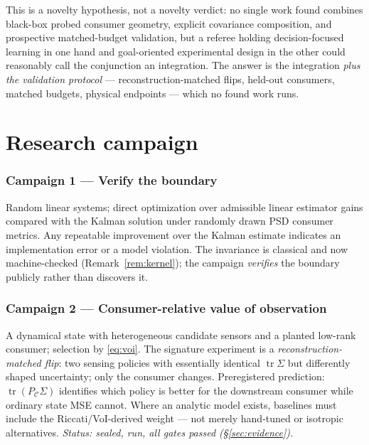 \documentclass{article}
\theoremstyle{definition}
\theoremstyle{remark}
\newcommand{\PC}{P_{\mathcal{C}}}
\newcommand{\tr}{\operatorname{tr}}
\newcommand{\Sig}{\Sigma}
\begin{document}
This is a novelty hypothesis, not a novelty verdict: no single work found
combines black-box probed consumer geometry, explicit covariance
composition, and prospective matched-budget validation, but a referee
holding decision-focused learning in one hand and goal-oriented experimental
design in the other could reasonably call the conjunction an integration.
The answer is the integration \emph{plus the validation protocol} ---
reconstruction-matched flips, held-out consumers, matched budgets, physical
endpoints --- which no found work runs.

\section{Research campaign}
\label{sec:campaigns}

\subsubsection*{Campaign 1 --- Verify the boundary}
Random linear systems; direct optimization over admissible linear estimator
gains compared with the Kalman solution under randomly drawn PSD consumer
metrics. Any repeatable improvement over the Kalman estimate indicates an
implementation error or a model violation. The invariance is classical and
now machine-checked (Remark~\ref{rem:kernel}); the campaign \emph{verifies}
the boundary publicly rather than discovers it.

\subsubsection*{Campaign 2 --- Consumer-relative value of observation}
A dynamical state with heterogeneous candidate sensors and a planted low-rank
consumer; selection by \eqref{eq:voi}. The signature experiment is a
\emph{reconstruction-matched flip}: two sensing policies with essentially
identical $\tr\Sig$ but differently shaped uncertainty; only the consumer
changes. Preregistered prediction: $\tr(\PC\Sig)$ identifies which policy is
better for the downstream consumer while ordinary state MSE cannot. Where an
analytic model exists, baselines must include the Riccati/VoI-derived weight
--- not merely hand-tuned or isotropic alternatives.
\emph{Status: sealed, run, all gates passed (\S\ref{sec:evidence}).}
\end{document}

